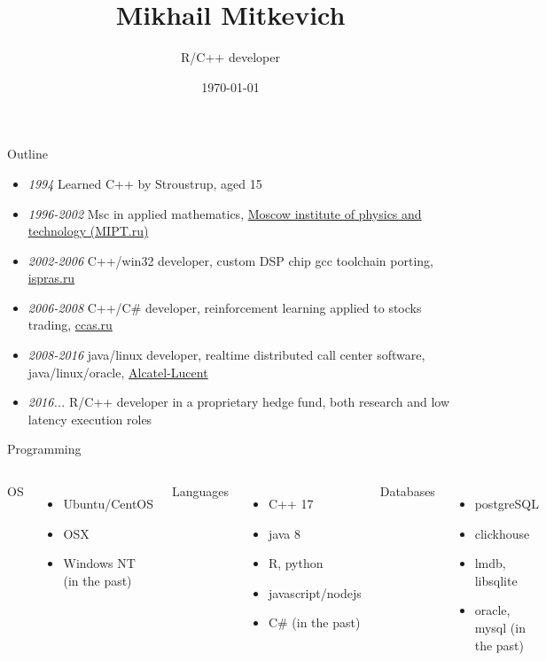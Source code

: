 \documentclass[10pt]{beamer}
\title{Mikhail Mitkevich}
\subtitle{R/C++ developer}
\date{\today}
\begin{document}
\maketitle

\begin{frame}[fragile]{Outline}

\begin{itemize}
\item  \textit{1994} Learned C++ by Stroustrup, aged 15
\item  \textit{1996-2002} Msc in applied mathematics, \href{https://www.timeshighereducation.com/world-university-rankings/moscow-institute-physics-and-technology}{Moscow institute of physics and technology (MIPT.ru)} 
\item \textit{2002-2006} C++/win32 developer, custom DSP chip gcc toolchain porting, \href{http://www.ispras.ru/en/}{ispras.ru} 
\item \textit{2006-2008} C++/C\# developer, reinforcement learning applied to stocks trading, \href{http://www.ccas.ru/index-e.htm}{ccas.ru}
\item  \textit{2008-2016} java/linux developer, realtime distributed call center software, java/linux/oracle,  \href{https://en.wikipedia.org/wiki/Alcatel-Lucent}{Alcatel-Lucent}
\item  \textit{2016...} R/C++ developer in a proprietary hedge fund, both research and low latency execution roles
\end{itemize}
\end{frame}

\begin{frame}{Programming}
  \begin{columns}[T,onlytextwidth]
      OS
      \begin{itemize}
        \item Ubuntu/CentOS
        \item OSX 
        \item Windows NT (in the past)
      \end{itemize}

      Languages
      \begin{itemize}
        \item C++ 17
        \item java 8
        \item R, python
        \item javascript/nodejs
        \item C\# (in the past)
      \end{itemize}

      Databases
      \begin{itemize}
        \item postgreSQL
        \item clickhouse
        \item lmdb, libsqlite
        \item oracle, mysql (in the past)
      \end{itemize}
  \end{columns}
\end{frame}
\end{document}
